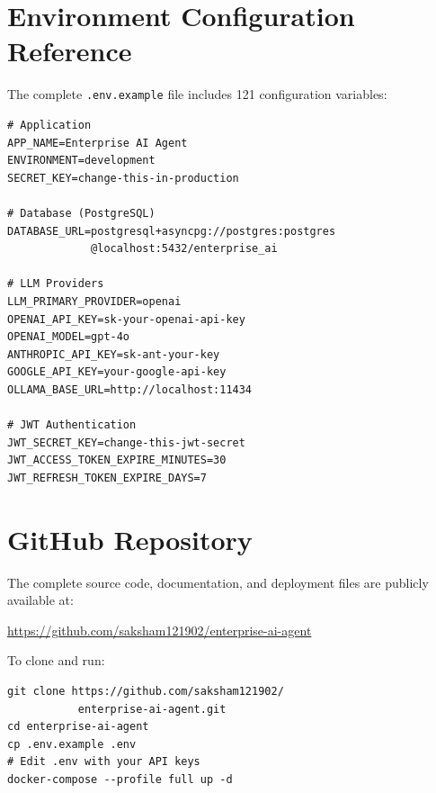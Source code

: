 \documentclass[12pt, a4paper]{report}
\begin{document}
\appendix
\chapter{Environment Configuration Reference}

The complete \texttt{.env.example} file includes 121 configuration variables:

\begin{lstlisting}[language={}, caption={Environment Configuration (excerpt)}]
# Application
APP_NAME=Enterprise AI Agent
ENVIRONMENT=development
SECRET_KEY=change-this-in-production

# Database (PostgreSQL)
DATABASE_URL=postgresql+asyncpg://postgres:postgres
             @localhost:5432/enterprise_ai

# LLM Providers
LLM_PRIMARY_PROVIDER=openai
OPENAI_API_KEY=sk-your-openai-api-key
OPENAI_MODEL=gpt-4o
ANTHROPIC_API_KEY=sk-ant-your-key
GOOGLE_API_KEY=your-google-api-key
OLLAMA_BASE_URL=http://localhost:11434

# JWT Authentication
JWT_SECRET_KEY=change-this-jwt-secret
JWT_ACCESS_TOKEN_EXPIRE_MINUTES=30
JWT_REFRESH_TOKEN_EXPIRE_DAYS=7
\end{lstlisting}

\chapter{GitHub Repository}

The complete source code, documentation, and deployment files are publicly available at:

\begin{center}
\Large\url{https://github.com/saksham121902/enterprise-ai-agent}
\end{center}

\noindent To clone and run:
\begin{lstlisting}[language={}]
git clone https://github.com/saksham121902/
           enterprise-ai-agent.git
cd enterprise-ai-agent
cp .env.example .env
# Edit .env with your API keys
docker-compose --profile full up -d
\end{lstlisting}
\end{document}
